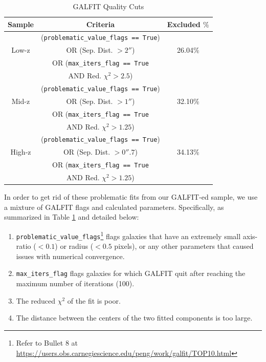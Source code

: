 \begin{table}
\centering
\caption{GALFIT Quality Cuts \label{tab_c3:galfit_quality_cuts}}
\begin{tabular}{c|c|c}
\hline
\hline
Sample & Criteria & Excluded $\%$ \\
\hline
    \hline
    \multirow{3}{*}{Low-z} & (\texttt{problematic\_value\_flags == True})  & \multirow{3}{*}{26.04\%} \\
    & OR (Sep. Dist. $> 2''$) & \\
    & OR (\texttt{max\_iters\_flag == True} & \\ 
    & AND Red. $\chi^2 > 2.5$) & \\
    \hline
    \multirow{3}{*}{Mid-z} & (\texttt{problematic\_value\_flags == True})  & \multirow{3}{*}{32.10\%} \\
    & OR (Sep. Dist. $> 1''$) & \\
    & OR (\texttt{max\_iters\_flag == True} & \\ 
    & AND Red. $\chi^2 > 1.25$) & \\
    \hline
    \multirow{3}{*}{High-z} & (\texttt{problematic\_value\_flags == True})  & \multirow{3}{*}{34.13\%} \\
    & OR (Sep. Dist. $> 0''.7$) & \\
    & OR (\texttt{max\_iters\_flag == True} & \\ 
    & AND Red. $\chi^2 > 1.25$) & \\
    \hline
\end{tabular}
\end{table}

In order to get rid of these problematic fits from our GALFIT-ed sample, we use a mixture of GALFIT flags and calculated parameters. Specifically, as summarized in Table \ref{tab_c3:galfit_quality_cuts} and detailed below:

\begin{enumerate}[label=\alph*)]
    \item \texttt{problematic\_value\_flags}\footnote{Refer to Bullet 8 at \href{https://users.obs.carnegiescience.edu/peng/work/galfit/TOP10.html}{\url{https://users.obs.carnegiescience.edu/peng/work/galfit/TOP10.html}}} flags galaxies that have an extremely small axis-ratio ($<0.1$) or radius ($<0.5$ pixels), or any other parameters that caused issues with numerical convergence. 
    \item \texttt{max\_iters\_flag} flags galaxies for which GALFIT quit after reaching the maximum number of iterations (100).
    \item The reduced $\chi^2$ of the fit is poor.
    \item The distance between the centers of the two fitted components is too large.
\end{enumerate}


